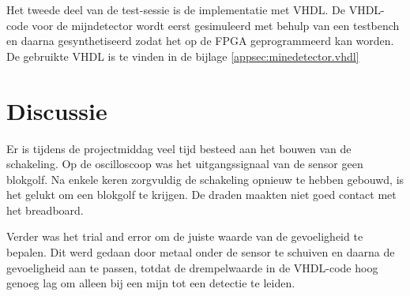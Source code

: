 \documentclass{report}
\begin{document}
\noindent Het tweede deel van de test-sessie is de implementatie met VHDL. De VHDL-code voor de mijndetector wordt eerst gesimuleerd met behulp van een testbench en daarna gesynthetiseerd zodat het op de FPGA geprogrammeerd kan worden. De gebruikte VHDL is te vinden in de bijlage \ref{appsec:minedetector.vhdl}

\section{Discussie}
Er is tijdens de projectmiddag veel tijd besteed aan het bouwen van de schakeling. Op de oscilloscoop was het uitgangssignaal van de sensor geen blokgolf. Na enkele keren zorgvuldig de schakeling opnieuw te hebben gebouwd, is het gelukt om een blokgolf te krijgen. De draden maakten niet goed contact met het breadboard.

Verder was het trial and error om de juiste waarde van de gevoeligheid te bepalen. Dit werd gedaan door metaal onder de sensor te schuiven en daarna de gevoeligheid aan te passen, totdat de drempelwaarde in de VHDL-code hoog genoeg lag om alleen bij een mijn tot een detectie te leiden.
\end{document}
